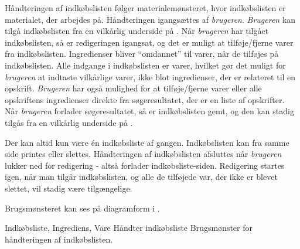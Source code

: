 {Håndteringen af indkøbslisten følger materialemønsteret\cite[p.~128]{ooad}, hvor indkøbslisten er materialet, der arbejdes på. Håndteringen igangsættes af \textit{brugeren}. \textit{Brugeren} kan tilgå indkøbslisten fra en vilkårlig underside på \Foodl. Når \textit{brugeren} har tilgået indkøbslisten, så er redigeringen igangsat, og det er muligt at tilføje/fjerne varer fra indkøbslisten. Ingredienser bliver ``omdannet'' til varer, når de tilføjes på indkøbslisten. Alle indgange i indkøbslisten er varer, hvilket gør det muligt for \textit{brugeren} at indtaste vilkårlige varer, ikke blot ingredienser, der er relateret til \fx en opskrift. \textit{Brugeren} har også mulighed for at tilføje/fjerne varer eller alle opskriftens ingredienser direkte fra søgeresultatet, der er en liste af opskrifter. Når \textit{brugeren} forlader søgeresultatet, så er indkøbslisten gemt, og den kan stadig tilgås fra en vilkårlig underside på \Foodl. 

Der kan altid kun være én indkøbsliste af gangen. Indkøbslisten kan fra samme side printes eller slettes. Håndteringen af indkøbslisten afsluttes når \textit{brugeren} lukker ned for redigering - altså forlader indkøbsliste-siden. Redigering startes igen, når man tilgår indkøbslisten, og alle de tilføjede var, der ikke er blevet slettet, vil stadig være tilgængelige.

Brugsmønsteret kan ses på diagramform i .}
{Indkøbsliste, Ingrediens, Vare}
{Håndter indkøbsliste}
{Brugsmønster for håndteringen af indkøbslisten.}
